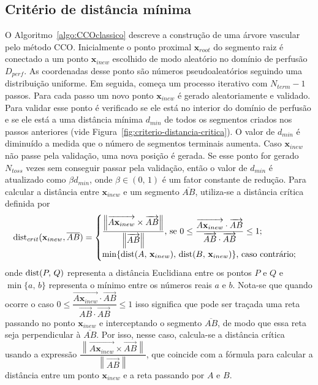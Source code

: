 \subsection{Critério de distância mínima}\label{sec:criterio-distancia-minima}

O Algoritmo~\ref{algo:CCOclassico} descreve a construção de uma árvore vascular pelo método CCO. 
Inicialmente o ponto proximal $\mathbf{x}_{root}$ do segmento raiz é conectado a um 
ponto $\mathbf{x}_{inew}$ escolhido de modo aleatório no domínio de perfusão $D_{perf}$.
As coordenadas desse ponto são números pseudoaleatórios seguindo uma distribuição uniforme.
Em seguida, começa um processo iterativo com $N_{term}-1$ passos. Para cada passo um novo 
ponto $\mathbf{x}_{inew}$ é gerado aleatoriamente e validado. Para validar 
esse ponto é verificado se ele está no interior do domínio de perfusão e se ele 
está a uma distância mínima $d_{min}$ de todos os segmentos criados nos passos 
anteriores (vide Figura~\ref{fig:criterio-distancia-critica}).
O valor de $d_{min}$ é diminuído a medida que o número de segmentos terminais aumenta.
Caso $\mathbf{x}_{inew}$ não passe pela validação, uma nova posição é gerada. Se esse 
ponto for gerado $N_{toss}$ vezes sem conseguir passar pela validação, então o valor de
$d_{min}$ é atualizado como $\beta d_{min}$, onde $\beta \in (0,\,1)$ é um fator
constante de redução. Para calcular a distância entre $\mathbf{x}_{inew}$ e um segmento
$\overline{AB}$, utiliza-se a distância crítica definida por
\begin{equation}
 \operatorname{dist}_{crit}(\mathbf{x}_{inew}, \overline{AB}) = \begin{cases}
                \dfrac{\left\|\overrightarrow{A\mathbf{x}_{inew}} \times \overrightarrow{AB}\right\|}{\left\|\overrightarrow{AB}\right\|}
                \textrm{, se }0 \leq \dfrac{\overrightarrow{A\mathbf{x}_{inew}}\cdot \overrightarrow{AB}}{\overrightarrow{AB}\cdot \overrightarrow{AB}} \leq 1;\\
                \min\{\operatorname{dist}(A,\,\mathbf{x}_{inew}),\, \operatorname{dist}(B,\,\mathbf{x}_{inew}) \}\textrm{, caso contrário;}
               \end{cases}
 \label{eq:dist-critica}
\end{equation}
onde $\operatorname{dist}(P,\,Q)$ representa a distância Euclidiana entre os pontos $P$ e $Q$ e 
$\min\{a,\,b\}$ representa o mínimo entre os números reais $a$ e $b$. Nota-se
que quando ocorre o caso 
$0\leq \dfrac{\overrightarrow{A\mathbf{x}_{inew}}\cdot \overrightarrow{AB}}{\overrightarrow{AB}\cdot \overrightarrow{AB}} \leq 1$ 
isso significa que pode ser traçada uma reta passando no ponto $\mathbf{x}_{inew}$
e interceptando o segmento $\overline{AB}$, de modo que essa reta seja perpendicular à $\overline{AB}$. Por isso,
nesse caso, calcula-se a distância crítica usando a
expressão $\dfrac{\left\|\overrightarrow{A\mathbf{x}_{inew}} \times \overrightarrow{AB}\right\|}{\left\|\overrightarrow{AB}\right\|}$,
que coincide com a fórmula para calcular a distância entre um ponto $\mathbf{x}_{inew}$ e a reta
passando por $A$ e $B$.

